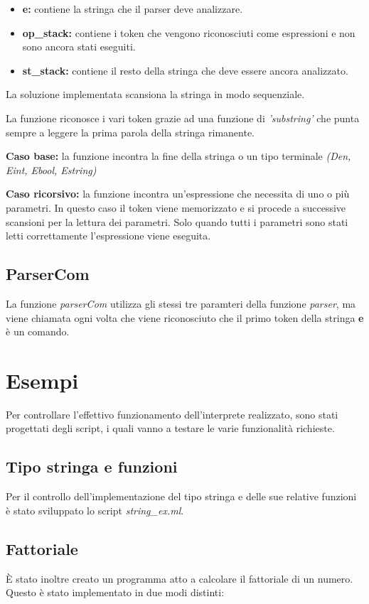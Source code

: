 \documentclass[a4paper,titlepage]{book}
\begin{document}
\begin{itemize}
\item \textbf{e:} contiene la stringa che il parser deve analizzare.
\item \textbf{op\_stack:} contiene i token che vengono riconosciuti come espressioni e non sono ancora stati eseguiti.
\item \textbf{st\_stack:} contiene il resto della stringa che deve essere ancora analizzato.
\end{itemize}
\clearpage
La soluzione implementata scansiona la stringa in modo sequenziale.

La funzione riconosce i vari token grazie ad una funzione di \textit{'substring'} che punta sempre a leggere la prima parola della stringa rimanente.

\textbf{Caso base:} la funzione incontra la fine della stringa o un tipo terminale \textit{(Den, Eint, Ebool, Estring)}

\textbf{Caso ricorsivo:} la funzione incontra un'espressione che necessita di uno o pi\`u parametri. In questo caso il token viene memorizzato e si procede a successive scansioni per la lettura dei parametri. Solo quando tutti i parametri sono stati letti correttamente l'espressione viene eseguita.

\section{ParserCom}
La funzione \textit{parserCom} utilizza gli stessi tre paramteri della funzione \textit{parser}, ma viene chiamata ogni volta che viene riconosciuto che il primo token della stringa \textbf{e} \`e un comando.

\chapter{Esempi}
Per controllare l'effettivo funzionamento dell'interprete realizzato, sono stati progettati degli script, i quali vanno a testare le varie funzionalit\`a richieste.

\section{Tipo stringa e funzioni}
Per il controllo dell'implementazione del tipo stringa e delle sue relative funzioni \`e stato sviluppato lo script \textit{string\_ex.ml}.

\section{Fattoriale}
\`E stato inoltre creato un programma atto a calcolare il fattoriale di un numero. Questo \`e stato implementato in due modi distinti:
\end{document}

